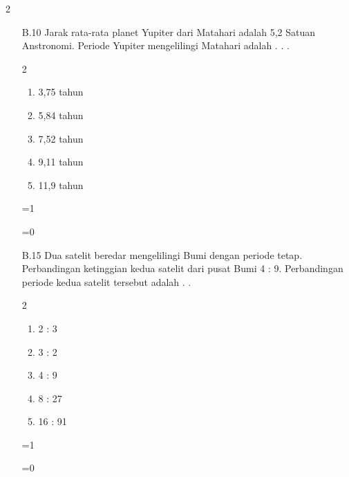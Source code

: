 \documentclass[11pt,a4paper]{article}
\def\tampilkunci{1}
\newcommand{\hide}[1]{\ifnum\tampilkunci=1
%
\begin{mybox}
 #1
\end{mybox}
%
\vspace{\baselineskip}\fi\ifnum\tampilkunci=0
%
\vspace{2cm}
%
\fi}
\newcommand{\pilgani}[1]{                            \vspace{-0.3cm}\begin{multicols}{2}
 \begin{enumerate}[label=\Alph*., itemsep=0pt,topsep=0pt,leftmargin=*,align=Center]#1                     \end{enumerate}
 \phantom{ini cuma sapi, wedus, dan ayam}
 \end{multicols}}
\begin{document}
\begin{multicols*}{2}
\begin{enumerate}
\item [B.10] Jarak rata-rata planet Yupiter dari Matahari adalah 5,2 Satuan Anstronomi. Periode Yupiter mengelilingi Matahari adalah . . . 
\pilgani{
	\item 3,75 tahun
	\item 5,84 tahun
	\item 7,52 tahun
	\item 9,11 tahun
	\item 11,9 tahun}
\hide{

}


\item [B.15] Dua satelit beredar mengelilingi Bumi dengan periode tetap. Perbandingan ketinggian kedua satelit dari pusat Bumi 4 : 9. Perbandingan periode kedua satelit tersebut adalah . . 
\pilgani{
	\item 2 : 3
	\item 3 : 2
	\item 4 : 9
	\item 8 : 27
	\item 16 : 91
	}
	
\hide{

}	




\end{enumerate}


\end{multicols*}
\end{document}
